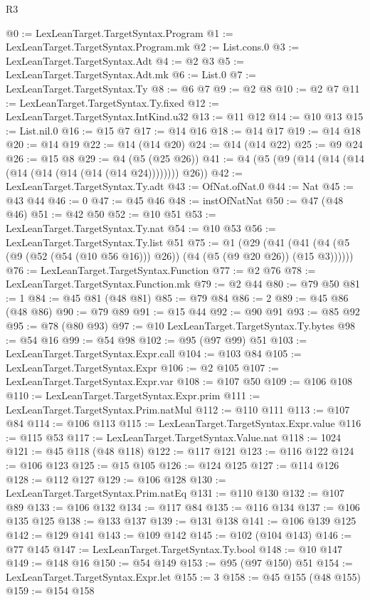 \begin{lexlean}{R3}
\begin{coremodule}
@0 := LexLeanTarget.TargetSyntax.Program
@1 := LexLeanTarget.TargetSyntax.Program.mk
@2 := List.cons.{0}
@3 := LexLeanTarget.TargetSyntax.Adt
@4 := @2 @3
@5 := LexLeanTarget.TargetSyntax.Adt.mk
@6 := List.{0}
@7 := LexLeanTarget.TargetSyntax.Ty
@8 := @6 @7
@9 := @2 @8
@10 := @2 @7
@11 := LexLeanTarget.TargetSyntax.Ty.fixed
@12 := LexLeanTarget.TargetSyntax.IntKind.u32
@13 := @11 @12
@14 := @10 @13
@15 := List.nil.{0}
@16 := @15 @7
@17 := @14 @16
@18 := @14 @17
@19 := @14 @18
@20 := @14 @19
@22 := @14 (@14 @20)
@24 := @14 (@14 @22)
@25 := @9 @24
@26 := @15 @8
@29 := @4 (@5 (@25 @26))
@41 := @4 (@5 (@9 (@14 (@14 (@14 (@14 (@14 (@14 (@14 (@14 @24)))))))) @26))
@42 := LexLeanTarget.TargetSyntax.Ty.adt
@43 := OfNat.ofNat.{0}
@44 := Nat
@45 := @43 @44
@46 := 0
@47 := @45 @46
@48 := instOfNatNat
@50 := @47 (@48 @46)
@51 := @42 @50
@52 := @10 @51
@53 := LexLeanTarget.TargetSyntax.Ty.nat
@54 := @10 @53
@56 := LexLeanTarget.TargetSyntax.Ty.list @51
@75 := @1
    (@29 (@41 (@41 (@4 (@5 (@9 (@52 (@54 (@10 @56 @16))) @26)) (@4 (@5 (@9 @20 @26)) (@15 @3))))))
@76 := LexLeanTarget.TargetSyntax.Function
@77 := @2 @76
@78 := LexLeanTarget.TargetSyntax.Function.mk
@79 := @2 @44
@80 := @79 @50
@81 := 1
@84 := @45 @81 (@48 @81)
@85 := @79 @84
@86 := 2
@89 := @45 @86 (@48 @86)
@90 := @79 @89
@91 := @15 @44
@92 := @90 @91
@93 := @85 @92
@95 := @78 (@80 @93)
@97 := @10 LexLeanTarget.TargetSyntax.Ty.bytes
@98 := @54 @16
@99 := @54 @98
@102 := @95 (@97 @99) @51
@103 := LexLeanTarget.TargetSyntax.Expr.call
@104 := @103 @84
@105 := LexLeanTarget.TargetSyntax.Expr
@106 := @2 @105
@107 := LexLeanTarget.TargetSyntax.Expr.var
@108 := @107 @50
@109 := @106 @108
@110 := LexLeanTarget.TargetSyntax.Expr.prim
@111 := LexLeanTarget.TargetSyntax.Prim.natMul
@112 := @110 @111
@113 := @107 @84
@114 := @106 @113
@115 := LexLeanTarget.TargetSyntax.Expr.value
@116 := @115 @53
@117 := LexLeanTarget.TargetSyntax.Value.nat
@118 := 1024
@121 := @45 @118 (@48 @118)
@122 := @117 @121
@123 := @116 @122
@124 := @106 @123
@125 := @15 @105
@126 := @124 @125
@127 := @114 @126
@128 := @112 @127
@129 := @106 @128
@130 := LexLeanTarget.TargetSyntax.Prim.natEq
@131 := @110 @130
@132 := @107 @89
@133 := @106 @132
@134 := @117 @84
@135 := @116 @134
@137 := @106 @135 @125
@138 := @133 @137
@139 := @131 @138
@141 := @106 @139 @125
@142 := @129 @141
@143 := @109 @142
@145 := @102 (@104 @143)
@146 := @77 @145
@147 := LexLeanTarget.TargetSyntax.Ty.bool
@148 := @10 @147
@149 := @148 @16
@150 := @54 @149
@153 := @95 (@97 @150) @51
@154 := LexLeanTarget.TargetSyntax.Expr.let
@155 := 3
@158 := @45 @155 (@48 @155)
@159 := @154 @158

\end{coremodule}
\end{lexlean}
